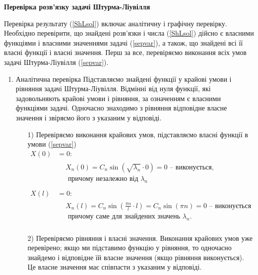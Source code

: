 \begin{center}
    \large{\textbf{Перевірка розв'язку задачі Штурма-Ліувілля}}
\end{center}

\noindent Перевірка результату (\ref{ShLsol}) включає аналітичну і графічну перевірку. Необхідно перевірити, що знайдені розв'язки і числа (\ref{ShLsol}) дійсно є власними функціями і власними значеннями задачі (\ref{sepvar}), а також, що знайдені всі її власні функції і власні значення. Перш за все, перевіряємо виконання всіх умов задачі Штурма-Ліувілля (\ref{sepvar}).
\begin{enumerate}[wide, labelindent=0pt]
    \item Аналітична перевірка 
    Підставляємо знайдені функції у крайові умови і рівняння задачі Штурма-Ліувілля. Відмінні від нуля функції, які задовольняють крайові умови і рівняння, за означенням є власними функціями задачі. Одночасно знаходимо з рівняння відповідне власне значення і звіряємо його з указаним у відповіді.
    \begin{enumerate}
        \item[1)] Перевіряємо виконання крайових умов, підставляємо власні функції в умови (\ref{sepvar}) 
        \begin{equation*}
            \begin{aligned}
                X(0) &=  0:\\
                &\begin{aligned}
                    &X_n(0) = C_n \sin(\sqrt{\lambda_n} \cdot 0) = 0 \text{ -- виконується,}\\
                    &\text{ причому незалежно від }\lambda_n
                \end{aligned}\\
                \\
                X(l) &= 0:\\
                &\begin{aligned}
                    &X_n(l) = C_n \sin\left(\frac{\pi n}{l} \cdot l\right) = C_n \sin(\pi n) = 0 \text{ -- виконується}\\
                    &\text{ причому саме для знайдених значень }\lambda_n.
                \end{aligned}\\
            \end{aligned}
        \end{equation*}
        \item[2)] Перевіряємо рівняння і власні значення. Виконання крайових умов уже перевірено; якщо ми підставимо функцію у рівняння, то одночасно знайдемо і відповідне їй власне значення (якщо рівняння виконується). Це власне значення має співпасти з указаним у відповіді. 
        

\end{enumerate}
\end{enumerate}
